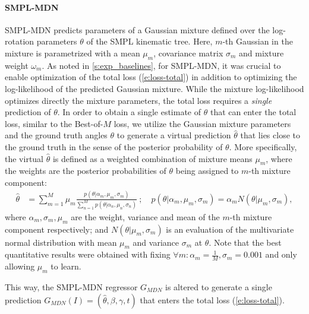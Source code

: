 \paragraph{SMPL-MDN}
SMPL-MDN predicts parameters of a Gaussian mixture defined over the log-rotation parameters $\theta$ of the SMPL kinematic tree.
Here, $m$-th Gaussian in the mixture is parametrized with a mean $\mu_m$, covariance matrix $\sigma_m$ and mixture weight $\omega_m$.
As noted in \cref{s:exp_baselines}, for SMPL-MDN, it was crucial to enable optimization of the total loss (\ref{e:loss-total}) in addition to optimizing the log-likelihood of the predicted Gaussian mixture.
While the mixture log-likelihood optimizes directly the mixture parameters, the total loss requires a \emph{single} prediction of $\theta$.
In order to obtain a single estimate of $\theta$ that can enter the total loss, similar to the Best-of-$M$ loss, we utilize the Gaussian mixture parameters and the ground truth angles $\theta$ to generate a virtual prediction $\hat \theta$ that lies close to the ground truth in the sense of the posterior probability of $\theta$.
More specifically, the virtual $\hat \theta$ is defined as a weighted combination of mixture means $\mu_m$, where the weights are the posterior probabilities of $\theta$ being assigned to $m$-th mixture component:
\begin{align}
\hat \theta &= 
\sum_{m=1}^{M} \mu_m 
\frac{
     p(\theta | \alpha_m, \mu_m, \sigma_m)
}{
    \sum_{n=1}^{M} p(\theta | \alpha_n, \mu_n, \sigma_n)
} ~ ; \quad
p(\theta | \alpha_m, \mu_m, \sigma_m)
= \alpha_m N( \theta | \mu_m, \sigma_m),
\end{align}
where $\alpha_m, \sigma_m, \mu_m$ are the weight, variance and mean of the $m$-th mixture component respectively; and $N( \theta | \mu_m, \sigma_m)$ is an evaluation of the multivariate normal distribution with mean $\mu_m$ and variance $\sigma_m$ at $\theta$. Note that the best quantitative results were obtained with fixing $\forall m: \alpha_m = \frac{1}{M}, \sigma_m = 0.001$ and only allowing $\mu_m$ to learn.

This way, the SMPL-MDN regressor $G_{MDN}$ is altered to generate a single prediction $G_{MDN}(I) = (\hat \theta, \beta, \gamma, t)$ that enters the total loss (\ref{e:loss-total}).

